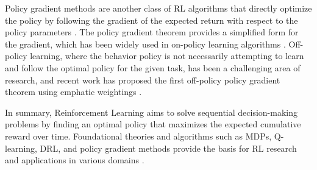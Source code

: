 Policy gradient methods are another class of RL algorithms that directly optimize the policy by following the gradient of the expected return with respect to the policy parameters \cite{1911.09048}. The policy gradient theorem provides a simplified form for the gradient, which has been widely used in on-policy learning algorithms \cite{1703.02102}. Off-policy learning, where the behavior policy is not necessarily attempting to learn and follow the optimal policy for the given task, has been a challenging area of research, and recent work has proposed the first off-policy policy gradient theorem using emphatic weightings \cite{1811.09013}.

In summary, Reinforcement Learning aims to solve sequential decision-making problems by finding an optimal policy that maximizes the expected cumulative reward over time. Foundational theories and algorithms such as MDPs, Q-learning, DRL, and policy gradient methods provide the basis for RL research and applications in various domains \cite{2001.09608, 2108.11510}.